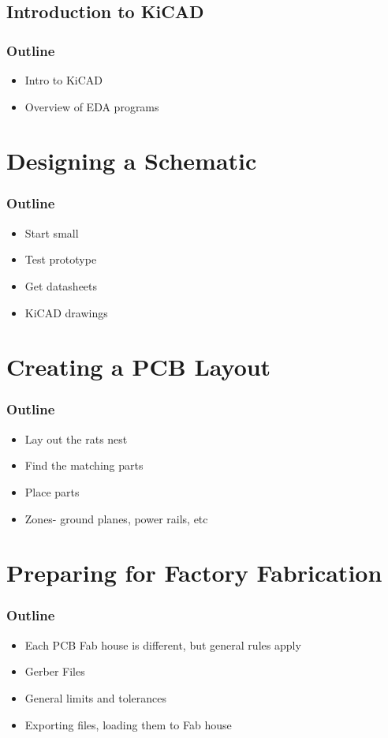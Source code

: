 \documentclass[]{beamer}
\begin{document}
\subsection[KiCAD]{Introduction to KiCAD}
\begin{frame}
    \frametitle{\insertsection{} Outline}
    \begin{itemize}
        \item Intro to KiCAD
        \item Overview of EDA programs
    \end{itemize}
\end{frame}

\section[Design]{Designing a Schematic}
\begin{frame}
    \frametitle{\insertsection{} Outline}
    \begin{itemize}
        \item Start small
        \item Test prototype
        \item Get datasheets
        \item KiCAD drawings
    \end{itemize}
\end{frame}

\section[Layout]{Creating a PCB Layout}
\begin{frame}
    \frametitle{\insertsection{} Outline}
    \begin{itemize}
        \item Lay out the rats nest
        \item Find the matching parts
        \item Place parts
        \item Zones- ground planes, power rails, etc
    \end{itemize}
\end{frame}

\section[Fabrication]{Preparing for Factory Fabrication}
\begin{frame}
    \frametitle{\insertsection{} Outline}
    \begin{itemize}
        \item Each PCB Fab house is different, but general rules apply
        \item Gerber Files
        \item General limits and tolerances
        \item Exporting files, loading them to Fab house
    \end{itemize}
\end{frame}
\end{document}
